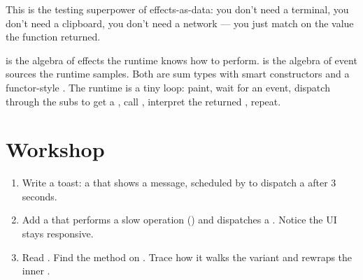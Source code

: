 This is the testing superpower of effects-as-data: you don't need a
terminal, you don't need a clipboard, you don't need a network ---
you just match on the value the function returned.

\begin{recap}
 is the algebra of effects the runtime knows how to
perform.  is the algebra of event sources the runtime
samples. Both are sum types with smart constructors and a
functor-style . The runtime is a tiny loop: paint, wait
for an event, dispatch through the subs to get a , call
, interpret the returned , repeat.
\end{recap}

\section*{Workshop}

\begin{enumerate}[leftmargin=*]
  \item Write a toast: a  that shows a message, scheduled
    by  to dispatch a  after 3
    seconds.
  \item Add a  that performs a slow operation
    () and dispatches a
     . Notice the UI stays responsive.
  \item Read . Find the
     method on . Trace how it walks the
    variant and rewraps the inner .
\end{enumerate}
